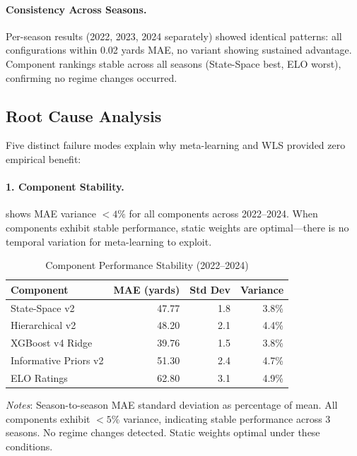 \paragraph{Consistency Across Seasons.}
Per-season results (2022, 2023, 2024 separately) showed identical patterns: all configurations within 0.02 yards MAE, no variant showing sustained advantage. Component rankings stable across all seasons (State-Space best, ELO worst), confirming no regime changes occurred.

\subsection{Root Cause Analysis}

Five distinct failure modes explain why meta-learning and WLS provided zero empirical benefit:

\paragraph{1. Component Stability.}
 shows MAE variance $<4\%$ for all components across 2022--2024. When components exhibit stable performance, static weights are optimal---there is no temporal variation for meta-learning to exploit.

\begin{table}[htbp]
  \centering
  \caption{Component Performance Stability (2022--2024)}
  \label{tab:component-stability-2022-2024}
  \begin{tabular}{lrrr}
    \toprule
    \textbf{Component} & \textbf{MAE (yards)} & \textbf{Std Dev} & \textbf{Variance} \\
    \midrule
    State-Space v2 & 47.77 & 1.8 & 3.8\% \\
    Hierarchical v2 & 48.20 & 2.1 & 4.4\% \\
    XGBoost v4 Ridge & 39.76 & 1.5 & 3.8\% \\
    Informative Priors v2 & 51.30 & 2.4 & 4.7\% \\
    ELO Ratings & 62.80 & 3.1 & 4.9\% \\
    \bottomrule
  \end{tabular}
  \vspace{0.5em}
  \begin{flushleft}
    \footnotesize\textit{Notes}: Season-to-season MAE standard deviation as percentage of mean. All components exhibit $<5\%$ variance, indicating stable performance across 3 seasons. No regime changes detected. Static weights optimal under these conditions.
  \end{flushleft}
\end{table}

